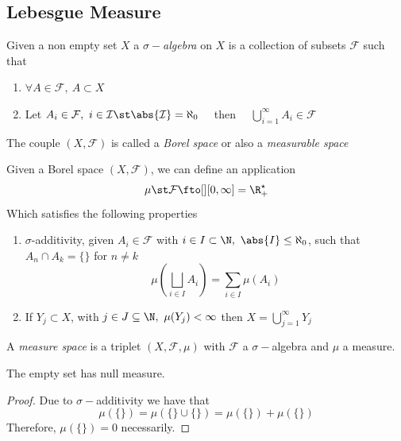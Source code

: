 \documentclass[../mmf.tex]{subfiles}
\begin{document}
\subsection{Lebesgue Measure}
\begin{dfn}
	Given a non empty set $X$ a $\sigma-$\textit{algebra} on $X$ is a collection of subsets $\mathcal{F}$ such that
	\begin{enumerate}
	\item $\forall A\in\mathcal{F},\ A\subset X$
	\item Let $A_i\in\mathcal{F},\ i\in\mathcal{I}\st\abs{\mathcal{I}}=\aleph_0\quad$ then $\quad\bigcup_{i=1}^\infty A_i\in\mathcal{F}$
	\end{enumerate}
	The couple $(X,\mathcal{F})$ is called a \textit{Borel space} or also a \textit{measurable space}
\end{dfn}
\begin{dfn}[Measure]
	Given a Borel space $(X,\mathcal{F})$, we can define an application
	\begin{equation}
		\mu\st\mathcal{F}\fto[][0,\infty]=\R^\star_+
		\label{eq:measure}
	\end{equation}
	Which satisfies the following properties
	\begin{enumerate}
	\item $\sigma$-additivity, given $A_i\in\mathcal{F}$ with $i\in I\subset\N,\ \abs{I}\le\aleph_0$, such that $A_n\cap A_k=\{\}$ for $n\ne k$
		\begin{equation*}
			\mu\left( \bigsqcup_{i\in I}A_i \right)=\sum_{i\in I}\mu(A_i)
		\end{equation*}
	\item If $Y_j\subset X$, with $j\in J\subseteq\N,\ \mu(Y_j)<\infty$ then $X=\bigcup_{j=1}^\infty Y_j$
	\end{enumerate}
\end{dfn}
\begin{dfn}
	A \textit{measure space} is a triplet $(X,\mathcal{F},\mu)$ with $\mathcal{F}$ a $\sigma-$algebra and $\mu$ a measure.
\end{dfn}
\begin{rmk}
	The empty set has null measure.
\end{rmk}
\begin{proof}
	Due to $\sigma-$additivity we have that
	\begin{equation*}
		\mu(\{\})=\mu(\{\}\cup\{\})=\mu(\{\})+\mu(\{\})
	\end{equation*}
	Therefore, $\mu(\{\})=0$ necessarily.
\end{proof}
\end{document}
